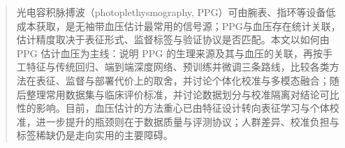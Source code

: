 
\begin{abstract}
光电容积脉搏波（photoplethysmography, PPG）可由腕表、指环等设备低成本获取，是无袖带血压估计最常用的信号源；PPG与血压存在统计关联，估计精度取决于表征形式、监督标签与验证协议是否匹配。本文以如何由 PPG 估计血压为主线：说明 PPG 的生理来源及其与血压的关联，再按手工特征与传统回归、端到端深度网络、预训练并微调三条路线，比较各类方法在表征、监督与部署代价上的取舍，并讨论个体化校准与多模态融合；随后整理常用数据集与临床评价标准，并讨论数据划分与校准隔离对结论可比性的影响。目前，血压估计的方法重心已由特征设计转向表征学习与个体校准，进一步提升的瓶颈则在于数据质量与评测协议；人群差异、校准负担与标签稀缺仍是走向实用的主要障碍。
\end{abstract}

\vspace{0.45\baselineskip}

